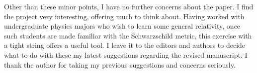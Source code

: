 \documentclass[12pt]{article}
\begin{document}
Other than these minor points, I have no further concerns about the
paper. I find the project very interesting, offering much to think
about. Having worked with undergraduate physics majors who wish to
learn some general relativity, once such students are made familiar
with the Schwarzschild metric, this exercise with a tight string
offers a useful tool. I leave it to the editors and authors to decide
what to do with these my latest suggestions regarding the revised
manuscript. I thank the author for taking my previous suggestions and
concerns seriously.
\end{document}
